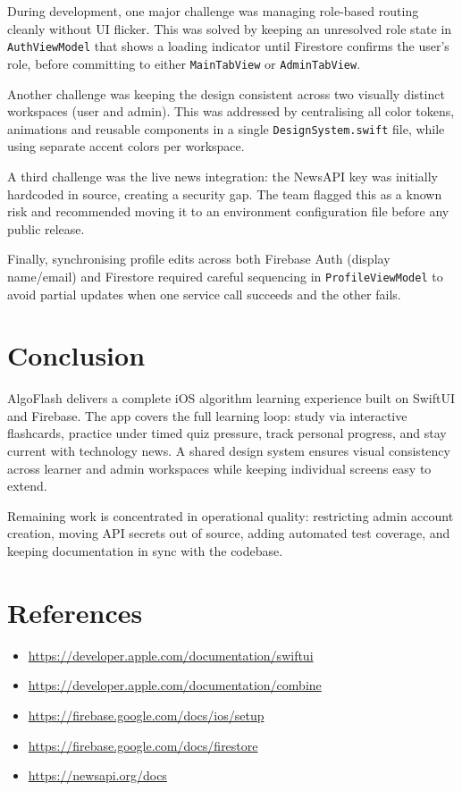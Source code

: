 \documentclass[12pt,a4paper]{article}
\begin{document}
During development, one major challenge was managing role-based routing cleanly
without UI flicker. This was solved by keeping an unresolved role state in
\texttt{AuthViewModel} that shows a loading indicator until Firestore confirms the
user's role, before committing to either \texttt{MainTabView} or \texttt{AdminTabView}.

Another challenge was keeping the design consistent across two visually distinct
workspaces (user and admin). This was addressed by centralising all color tokens,
animations and reusable components in a single \texttt{DesignSystem.swift}
file, while using separate accent colors per workspace.

A third challenge was the live news integration: the NewsAPI key was initially
hardcoded in source, creating a security gap. The team flagged this as a known risk
and recommended moving it to an environment configuration file before any public
release.

Finally, synchronising profile edits across both Firebase Auth (display name/email)
and Firestore required careful sequencing in \texttt{ProfileViewModel} to avoid
partial updates when one service call succeeds and the other fails.

\section*{Conclusion}

AlgoFlash delivers a complete iOS algorithm learning experience built on SwiftUI and
Firebase. The app covers the full learning loop: study via interactive flashcards,
practice under timed quiz pressure, track personal progress, and stay current with
technology news. A shared design system ensures visual consistency across learner and
admin workspaces while keeping individual screens easy to extend.

Remaining work is concentrated in operational quality: restricting admin account
creation, moving API secrets out of source, adding automated test coverage, and
keeping documentation in sync with the codebase.

\section*{References}

\begin{itemize}[leftmargin=1.5em, itemsep=3pt]
  \item \url{https://developer.apple.com/documentation/swiftui}
  \item \url{https://developer.apple.com/documentation/combine}
  \item \url{https://firebase.google.com/docs/ios/setup}
  \item \url{https://firebase.google.com/docs/firestore}
  \item \url{https://newsapi.org/docs}
\end{itemize}
\end{document}
